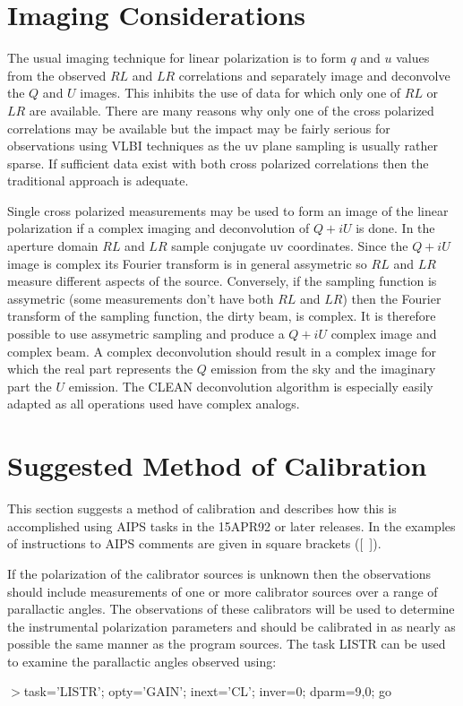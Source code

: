 \section{Imaging Considerations}

   The usual imaging technique for linear polarization is to form $q$
and $u$ values from the observed $RL$ and $LR$ correlations and
separately image and deconvolve the $Q$ and $U$ images.
This inhibits the use of data for which only one of $RL$ or $LR$ are
available.  There are many reasons why only one of the cross polarized
correlations may be available but the impact may be fairly serious for
observations using VLBI techniques as the uv plane sampling is usually
rather sparse.  If sufficient data exist with both cross
polarized correlations then the traditional approach is adequate.

   Single cross polarized measurements may be used to form an image of
the linear polarization if a complex imaging and deconvolution of
$Q+iU$ is done.  In the aperture domain $RL$ and $LR$ sample
conjugate uv coordinates.  Since the $Q+iU$ image is complex its
Fourier transform is in general assymetric so $RL$ and $LR$ measure
different aspects of the source.  Conversely, if the sampling function
is assymetric (some measurements don't have both $RL$ and $LR$) then
the Fourier transform of the sampling function, the dirty beam, is
complex.   It is therefore possible to use assymetric sampling and
produce a $Q+iU$ complex image and complex beam.  A complex
deconvolution should result in a complex image for which the real part
represents the $Q$ emission from the sky and the imaginary part the
$U$ emission.  The CLEAN deconvolution algorithm is especially easily
adapted as all operations used have complex analogs.

\vfil\eject
\section{Suggested Method of Calibration}

   This section suggests a method of calibration and describes how
this is accomplished using AIPS tasks in the 15APR92 or later
releases.  In the examples of instructions to AIPS comments are given
in square brackets ([~]).

If the polarization of the calibrator sources is unknown then
the observations should include measurements of one or more
calibrator sources over a range of parallactic angles.  The
observations of these calibrators will be used to determine the
instrumental polarization parameters and should be calibrated in as
nearly as possible the same manner as the program sources.
The task LISTR can be used to examine the parallactic angles
observed using:
\par\noindent
$>$task='LISTR'; opty='GAIN'; inext='CL'; inver=0; dparm=9,0; go


